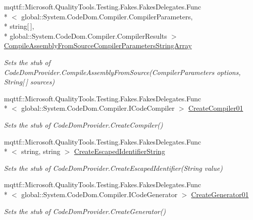 \begin{DoxyCompactItemize}
mqttf\-::\-Microsoft.\-Quality\-Tools.\-Testing.\-Fakes.\-Fakes\-Delegates.\-Func\\*
$<$ global\-::\-System.\-Code\-Dom.\-Compiler.\-Compiler\-Parameters, \\*
string\mbox{[}$\,$\mbox{]}, \\*
global\-::\-System.\-Code\-Dom.\-Compiler.\-Compiler\-Results $>$ \hyperlink{class_system_1_1_code_dom_1_1_compiler_1_1_fakes_1_1_stub_code_dom_provider_a8174d34e995921c40fffe7fdddb1d69a}{Compile\-Assembly\-From\-Source\-Compiler\-Parameters\-String\-Array}
\begin{DoxyCompactList}\small\item\em Sets the stub of Code\-Dom\-Provider.\-Compile\-Assembly\-From\-Source(\-Compiler\-Parameters options, String\mbox{[}$\,$\mbox{]} sources)\end{DoxyCompactList}\item 
mqttf\-::\-Microsoft.\-Quality\-Tools.\-Testing.\-Fakes.\-Fakes\-Delegates.\-Func\\*
$<$ global\-::\-System.\-Code\-Dom.\-Compiler.\-I\-Code\-Compiler $>$ \hyperlink{class_system_1_1_code_dom_1_1_compiler_1_1_fakes_1_1_stub_code_dom_provider_a38ea8018f53db24bf4fa0f7999b155c5}{Create\-Compiler01}
\begin{DoxyCompactList}\small\item\em Sets the stub of Code\-Dom\-Provider.\-Create\-Compiler()\end{DoxyCompactList}\item 
mqttf\-::\-Microsoft.\-Quality\-Tools.\-Testing.\-Fakes.\-Fakes\-Delegates.\-Func\\*
$<$ string, string $>$ \hyperlink{class_system_1_1_code_dom_1_1_compiler_1_1_fakes_1_1_stub_code_dom_provider_ad7406bb232a2919cefdc4b45207b030c}{Create\-Escaped\-Identifier\-String}
\begin{DoxyCompactList}\small\item\em Sets the stub of Code\-Dom\-Provider.\-Create\-Escaped\-Identifier(\-String value)\end{DoxyCompactList}\item 
mqttf\-::\-Microsoft.\-Quality\-Tools.\-Testing.\-Fakes.\-Fakes\-Delegates.\-Func\\*
$<$ global\-::\-System.\-Code\-Dom.\-Compiler.\-I\-Code\-Generator $>$ \hyperlink{class_system_1_1_code_dom_1_1_compiler_1_1_fakes_1_1_stub_code_dom_provider_a1c07f8c5776eb9aa0fd95814c7ad6263}{Create\-Generator01}
\begin{DoxyCompactList}\small\item\em Sets the stub of Code\-Dom\-Provider.\-Create\-Generator()\end{DoxyCompactList}\item 

\end{DoxyCompactItemize}
